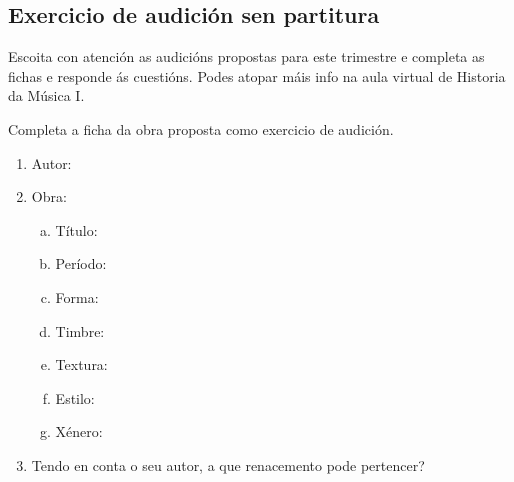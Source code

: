 \subsection*{Exercicio de audición sen partitura}
%
Escoita con atención as audicións propostas para este trimestre e completa as fichas e responde ás cuestións.
Podes atopar máis info na aula virtual de Historia da Música I.
%
\begin{multicols}{2}
%
%
\begin{ejercicio} 
%
Completa a ficha da obra proposta como exercicio de audición.
%
	\begin{enumerate}[1.-]
        \vspace*{0.3cm}
		\item
			Autor: \dotfill
			\vspace*{0.3cm}
		\item
			Obra:
			\begin{enumerate}[a)]
			    \item Título: \dotfill \vspace*{0.3cm}
			    \item Período: \dotfill \vspace*{0.3cm}
			    \item Forma: \dotfill \vspace*{0.3cm}
			    \item Timbre: \dotfill 			\vspace*{0.3cm}
			    \item Textura: \dotfill \vspace*{0.3cm}
			    \item Estilo: \dotfill \vspace*{0.3cm}
			    \item Xénero: \dotfill 
			    \vspace*{0.3cm}
			\end{enumerate}
		\item 
		    Tendo en conta o seu autor, a que renacemento pode pertencer?


\end{enumerate}
\end{ejercicio}
\end{multicols}
